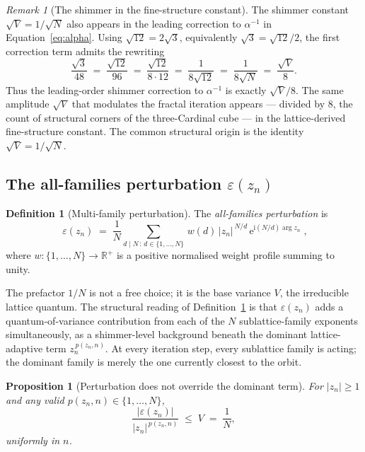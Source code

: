 \documentclass[11pt,a4paper]{article}
\newtheorem{proposition}[theorem]{Proposition}
\theoremstyle{definition}
\newtheorem{definition}[theorem]{Definition}
\theoremstyle{remark}
\newtheorem{remark}[theorem]{Remark}
\newcommand{\R}{\mathbb{R}}
\begin{document}
\begin{remark}[The shimmer in the fine-structure constant]
The shimmer constant $\sqrt{V}=1/\sqrt{N}$ also appears in the leading correction to $\alpha^{-1}$ in Equation~\eqref{eq:alpha}. Using $\sqrt{12}=2\sqrt{3}$, equivalently $\sqrt{3}=\sqrt{12}/2$, the first correction term admits the rewriting
\[
\frac{\sqrt{3}}{48} \;=\; \frac{\sqrt{12}}{96} \;=\; \frac{\sqrt{12}}{8\cdot 12} \;=\; \frac{1}{8\sqrt{12}} \;=\; \frac{1}{8\sqrt{N}} \;=\; \frac{\sqrt{V}}{8}.
\]
Thus the leading-order shimmer correction to $\alpha^{-1}$ is exactly $\sqrt{V}/8$. The same amplitude $\sqrt{V}$ that modulates the fractal iteration appears --- divided by $8$, the count of structural corners of the three-Cardinal cube --- in the lattice-derived fine-structure constant. The common structural origin is the identity $\sqrt{V}=1/\sqrt{N}$.
\end{remark}

\subsection{The all-families perturbation $\varepsilon(z_{n})$}\label{subsec:dI-perturb}

\begin{definition}[Multi-family perturbation]\label{def:dI-eps}
The \emph{all-families perturbation} is
\[
\boxed{\;\varepsilon(z_{n}) \;=\; \frac{1}{N}\sum_{d\mid N\,:\,d\in\{1,\ldots,N\}}\, w(d)\,|z_{n}|^{\,N/d}\,\mathrm{e}^{\mathrm{i}(N/d)\arg z_{n}}\;,}
\]
where $w:\{1,\ldots,N\}\to\R^{+}$ is a positive normalised weight profile summing to unity.
\end{definition}

The prefactor $1/N$ is not a free choice; it is the base variance $V$, the irreducible lattice quantum. The structural reading of Definition~\ref{def:dI-eps} is that $\varepsilon(z_{n})$ adds a quantum-of-variance contribution from each of the $N$ sublattice-family exponents simultaneously, as a shimmer-level background beneath the dominant lattice-adaptive term $z_{n}^{\,p(z_{n},n)}$. At every iteration step, every sublattice family is acting; the dominant family is merely the one currently closest to the orbit.

\begin{proposition}[Perturbation does not override the dominant term]
For $|z_{n}|\geq 1$ and any valid $p(z_{n},n)\in\{1,\ldots,N\}$,
\[
\frac{|\varepsilon(z_{n})|}{|z_{n}|^{\,p(z_{n},n)}} \;\leq\; V \;=\; \frac{1}{N},
\]
uniformly in $n$.
\end{proposition}
\end{document}
